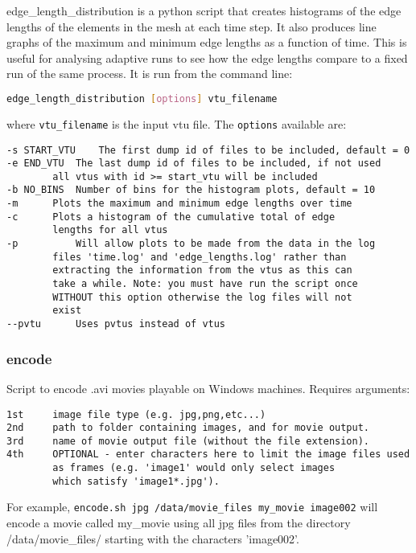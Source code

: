 edge\_length\_distribution is a python script that creates histograms of the edge lengths of the elements in the mesh at each time step. It also produces line graphs of the maximum and minimum edge lengths as a function of time. This is useful for analysing adaptive runs to see how the edge lengths compare to a fixed run of the same process.  It is run from the command line:
\begin{lstlisting}[language = Bash]
edge_length_distribution [options] vtu_filename
\end{lstlisting}
where \lstinline[language = Python]+vtu_filename+ is the input vtu file. The \lstinline[language = Bash]+options+ available are:
\begin{lstlisting}
-s START_VTU	The first dump id of files to be included, default = 0
-e END_VTU	The last dump id of files to be included, if not used
		all vtus with id >= start_vtu will be included
-b NO_BINS	Number of bins for the histogram plots, default = 10
-m		Plots the maximum and minimum edge lengths over time
-c		Plots a histogram of the cumulative total of edge
		lengths for all vtus
-p        	Will allow plots to be made from the data in the log
		files 'time.log' and 'edge_lengths.log' rather than
		extracting the information from the vtus as this can
		take a while. Note: you must have run the script once
		WITHOUT this option otherwise the log files will not
		exist
--pvtu		Uses pvtus instead of vtus

\end{lstlisting}


\subsubsection{encode}
\label{sec:encode}
Script to encode .avi movies playable on Windows machines. Requires arguments:   
\begin{lstlisting}
1st     image file type (e.g. jpg,png,etc...)
2nd     path to folder containing images, and for movie output.
3rd     name of movie output file (without the file extension).
4th     OPTIONAL - enter characters here to limit the image files used 
        as frames (e.g. 'image1' would only select images 
        which satisfy 'image1*.jpg').
\end{lstlisting}

For example, \texttt{encode.sh jpg /data/movie\_files my\_movie image002} will encode a movie called my\_movie using all jpg files from the directory /data/movie\_files/ starting with the characters 'image002'.


